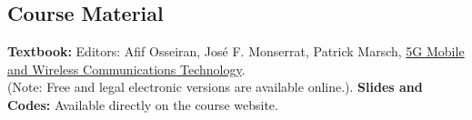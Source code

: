 
\subsection*{Course Material} 

\begin{outline}
	\1 \textbf{Textbook:}  Editors: Afif Osseiran, José F. Monserrat, Patrick Marsch, \href{https://digilib.stekom.ac.id/assets/dokumen/ebook/feb_6dc75f6bb1ff6ccaf3c3bc84d5bfb41cd71f701a_1652450470.pdf}{5G Mobile and Wireless Communications Technology}.\\
(Note: Free and legal electronic versions are available online.).
	\1 \textbf{Slides and Codes:} Available directly on the course website.
\end{outline}
